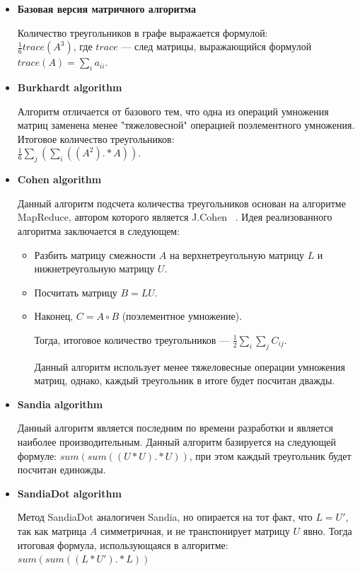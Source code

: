 \documentclass[14pt]{matmex-diploma}
\begin{document}
\begin{itemize}
\item \textbf{Базовая версия матричного алгоритма}

Количество треугольников в графе выражается формулой:\\ $\frac{1}{6}trace(A^{3})$, где $trace$ --- след матрицы, выражающийся формулой $trace(A) = \sum_{i}a_{ii}$.

\item \textbf {Burkhardt algorithm}

 Алгоритм отличается от базового тем, что одна из операций умножения матриц заменена менее "тяжеловесной" операцией поэлементного умножения. Итоговое количество треугольников: \\  $\frac{1}{6} \sum\limits_j (\sum\limits_i ((A^{2}) .* A))$.
 
\item \textbf{Cohen algorithm}

Данный алгоритм подсчета количества треугольников основан на алгоритме MapReduce, автором которого является J.Cohen ~\cite{Cohen}. Идея реализованного алгоритма заключается в следующем:
\begin{itemize}
    \item Разбить матрицу смежности $A$ на верхнетреугольную матрицу $L$ и нижнетреугольную матрицу $U$.
    \item Посчитать матрицу $B = LU$.
    \item Наконец, $C = A \circ B$ (поэлементное умножение).
       
      Тогда, итоговое количество треугольников ---  $\frac{1}{2}\sum\limits_i\sum\limits_j C_{ij}$.
      
      Данный алгоритм использует менее тяжеловесные операции умножения матриц, однако, каждый треугольник в итоге будет посчитан дважды.
\end{itemize}

\item \textbf{Sandia algorithm}

Данный алгоритм является последним по времени разработки и является наиболее производительным. Данный алгоритм базируется на следующей формуле: $sum (sum ((U * U) .* U))$, при этом каждый треугольник будет посчитан единожды.
\item  \textbf{SandiaDot algorithm}

Метод SandiaDot аналогичен Sandia, но опирается на тот факт, что $L = U'$, так как матрица $A$ симметричная, и не транспонирует матрицу $U$ явно. Тогда итоговая формула, использующаяся в алгоритме: $sum (sum ((L * U') .* L))$
\end{itemize}
\end{document}

